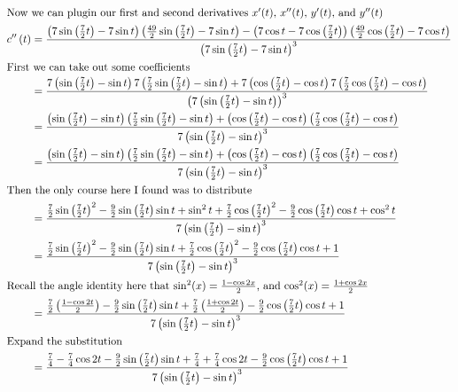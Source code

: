 \documentclass[12pt]{article}
\begin{document}
\begin{align}
  \intertext{Now we can plugin our first and second derivatives $x'(t)$, $x''(t)$, $y'(t)$, and $y''(t)$}
  c''\left(t\right) & =\frac{\left(7\sin\left(\frac{7}{2}t\right)-7\sin t\right)\left(\frac{49}{2}\sin\left(\frac{7}{2}t\right)-7\sin t\right)-\left(7\cos t-7\cos\left(\frac{7}{2}t\right)\right)\left(\frac{49}{2}\cos\left(\frac{7}{2}t\right)-7\cos t\right)}{\left(7\sin\left(\frac{7}{2}t\right)-7\sin t\right)^{3}}         \\
  \intertext{First we can take out some coefficients}
                    & =\frac{7\left(\sin\left(\frac{7}{2}t\right)-\sin t\right)7\left(\frac{7}{2}\sin\left(\frac{7}{2}t\right)-\sin t\right)+7\left(\cos\left(\frac{7}{2}t\right)-\cos t\right)7\left(\frac{7}{2}\cos\left(\frac{7}{2}t\right)-\cos t\right)}{\left(7\left(\sin\left(\frac{7}{2}t\right)-\sin t\right)\right)^{3}} \\
                    & =\frac{\left(\sin\left(\frac{7}{2}t\right)-\sin t\right)\left(\frac{7}{2}\sin\left(\frac{7}{2}t\right)-\sin t\right)+\left(\cos\left(\frac{7}{2}t\right)-\cos t\right)\left(\frac{7}{2}\cos\left(\frac{7}{2}t\right)-\cos t\right)}{7\left(\sin\left(\frac{7}{2}t\right)-\sin t\right)^{3}}                  \\
                    & =\frac{\left(\sin\left(\frac{7}{2}t\right)-\sin t\right)\left(\frac{7}{2}\sin\left(\frac{7}{2}t\right)-\sin t\right)+\left(\cos\left(\frac{7}{2}t\right)-\cos t\right)\left(\frac{7}{2}\cos\left(\frac{7}{2}t\right)-\cos t\right)}{7\left(\sin\left(\frac{7}{2}t\right)-\sin t\right)^{3}}                  \\
  \intertext{Then the only course here I found was to distribute}
                    & =\frac{\frac{7}{2}\sin\left(\frac{7}{2}t\right)^{2}-\frac{9}{2}\sin\left(\frac{7}{2}t\right)\sin t+\sin^{2}t+\frac{7}{2}\cos\left(\frac{7}{2}t\right)^{2}-\frac{9}{2}\cos\left(\frac{7}{2}t\right)\cos t+\cos^{2}t}{7\left(\sin\left(\frac{7}{2}t\right)-\sin t\right)^{3}}                                  \\
                    & =\frac{\frac{7}{2}\sin\left(\frac{7}{2}t\right)^{2}-\frac{9}{2}\sin\left(\frac{7}{2}t\right)\sin t+\frac{7}{2}\cos\left(\frac{7}{2}t\right)^{2}-\frac{9}{2}\cos\left(\frac{7}{2}t\right)\cos t+1}{7\left(\sin\left(\frac{7}{2}t\right)-\sin t\right)^{3}}                                                    \\
  \intertext{Recall the angle identity here that $\sin^2(x) = \frac{1-\cos2x}{2}$, and $\cos^2(x) = \frac{1+\cos2x}{2}$}
                    & =\frac{\frac{7}{2}\left(\frac{1-\cos2t}{2}\right)-\frac{9}{2}\sin\left(\frac{7}{2}t\right)\sin t+\frac{7}{2}\left(\frac{1+\cos2t}{2}\right)-\frac{9}{2}\cos\left(\frac{7}{2}t\right)\cos t+1}{7\left(\sin\left(\frac{7}{2}t\right)-\sin t\right)^{3}}                                                        \\
  \intertext{Expand the substitution}
                    & =\frac{\frac{7}{4}-\frac{7}{4}\cos2t-\frac{9}{2}\sin\left(\frac{7}{2}t\right)\sin t+\frac{7}{4}+\frac{7}{4}\cos2t-\frac{9}{2}\cos\left(\frac{7}{2}t\right)\cos t+1}{7\left(\sin\left(\frac{7}{2}t\right)-\sin t\right)^{3}}
\end{align}
\end{document}
